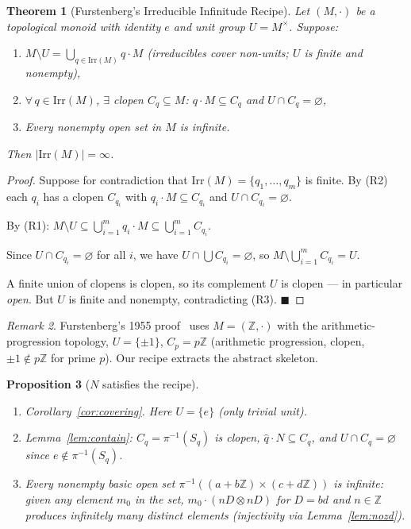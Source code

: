 \documentclass[12pt,a4paper]{amsart}
\theoremstyle{plain}
\newtheorem{theorem}{Theorem}[section]
\newtheorem{proposition}[theorem]{Proposition}
\theoremstyle{definition}
\theoremstyle{remark}
\newtheorem{remark}[theorem]{Remark}
\newcommand{\Irr}{\mathrm{Irr}}
\newcommand{\qhat}[1]{\widehat{#1}}
\newcommand{\bbZ}{\mathbb{Z}}
\begin{document}
\begin{theorem}[Furstenberg's Irreducible Infinitude Recipe]
\label{thm:recipe}
Let $(M, \cdot)$ be a topological monoid with identity $e$ and unit group
$U = M^{\times}$. Suppose:
\begin{enumerate}[label=\textbf{(R\arabic*)},nosep]
  \item $M \setminus U = \bigcup_{q \in \Irr(M)} q \cdot M$
        \quad (irreducibles cover non-units; $U$ is finite and nonempty),
  \item $\forall\, q \in \Irr(M)$, $\exists$ clopen $C_q \subseteq M$:
        $q \cdot M \subseteq C_q$ and $U \cap C_q = \varnothing$,
  \item Every nonempty open set in $M$ is infinite.
\end{enumerate}
Then $|\Irr(M)| = \infty$.
\end{theorem}
\begin{proof}
Suppose for contradiction that $\Irr(M) = \{q_1, \ldots, q_m\}$ is
finite. By (R2) each $q_i$ has a clopen $C_{q_i}$ with
$q_i \cdot M \subseteq C_{q_i}$ and $U \cap C_{q_i} = \varnothing$.

By (R1): $M \setminus U \subseteq \bigcup_{i=1}^m q_i \cdot M \subseteq
\bigcup_{i=1}^m C_{q_i}$.

Since $U \cap C_{q_i} = \varnothing$ for all $i$, we have
$U \cap \bigcup C_{q_i} = \varnothing$, so
$M \setminus \bigcup_{i=1}^m C_{q_i} = U$.

A finite union of clopens is clopen, so its complement $U$ is clopen ---
in particular \emph{open}. But $U$ is finite and nonempty, contradicting
(R3). $\blacksquare$
\end{proof}

\begin{remark}
Furstenberg's 1955 proof~\cite{Furstenberg1955} uses $M = (\bbZ, \cdot)$
with the arithmetic-progression topology, $U = \{\pm 1\}$, $C_p = p\bbZ$
(arithmetic progression, clopen, $\pm 1 \notin p\bbZ$ for prime $p$).
Our recipe extracts the abstract skeleton.
\end{remark}

\begin{proposition}[$N$ satisfies the recipe]
\label{prop:nfits}
\begin{enumerate}[label=\textbf{(R\arabic*)},nosep]
  \item Corollary~\ref{cor:covering}. Here $U = \{e\}$ (only trivial unit).
  \item Lemma~\ref{lem:contain}: $C_q = \pi^{-1}(S_q)$ is clopen,
        $\qhat{q} \cdot N \subseteq C_q$, and $U \cap C_q = \varnothing$
        since $e \notin \pi^{-1}(S_q)$.
  \item Every nonempty basic open set
        $\pi^{-1}((a+b\bbZ) \times (c+d\bbZ))$ is infinite: given any
        element $m_0$ in the set, $m_0 \cdot (nD \otimes nD)$ for
        $D = bd$ and $n \in \bbZ$ produces infinitely many distinct
        elements (injectivity via Lemma~\ref{lem:nozd}).
\end{enumerate}
\end{proposition}
\end{document}
